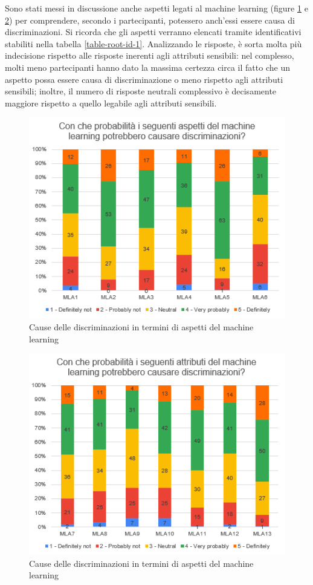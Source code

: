 Sono stati messi in discussione anche aspetti legati al machine learning (figure \ref{im-a-root-4} e \ref{im-a-root-5}) per comprendere, secondo i partecipanti, potessero anch'essi essere causa di discriminazioni. Si ricorda che gli aspetti verranno elencati tramite identificativi stabiliti nella tabella \ref{table-root-id-1}. Analizzando le risposte, è sorta molta più indecisione rispetto alle risposte inerenti agli attributi sensibili: nel complesso, molti meno partecipanti hanno dato la massima certezza circa il fatto che un aspetto possa essere causa di discriminazione o meno rispetto agli attributi sensibili; inoltre, il numero di risposte neutrali complessivo è decisamente maggiore rispetto a quello legabile agli attributi sensibili.

\begin{figure}[h!]
    \centering
    \includegraphics[width=360pt]{figure/data-analysis2/asp1.png}
    \caption{Cause delle discriminazioni in termini di aspetti del machine learning}
    \label{im-a-root-4}
\end{figure}
\begin{figure}[h!]
    \centering
    \includegraphics[width=360pt]{figure/data-analysis2/asp2.png}
    \caption{Cause delle discriminazioni in termini di aspetti del machine learning}
    \label{im-a-root-5}
\end{figure}

